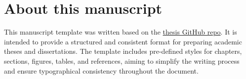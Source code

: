 
\chapter*{About this manuscript} \label{sec:about}

This manuscript template was written based on the \href{https://github.com/ricarvid1/dsj-thesis}{thesis GitHub repo}.
It is intended to provide a structured and consistent format for preparing academic theses and dissertations.
The template includes pre-defined styles for chapters, sections, figures, tables, and references, aiming to simplify the writing process and ensure typographical consistency throughout the document.
